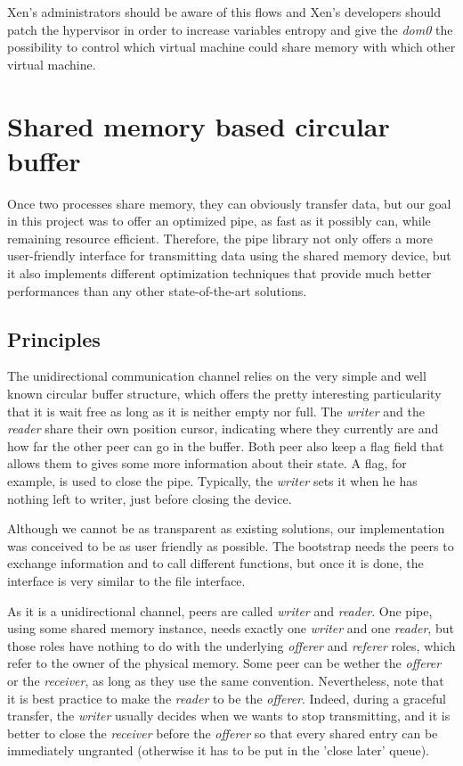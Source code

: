 \documentclass[journal]{IEEEtran}
\begin{document}
Xen's administrators should be aware of this flows and Xen's developers should patch the hypervisor in order to increase variables entropy and give the \emph{dom0} the possibility to control which virtual machine could share memory with which other virtual machine.

\section{Shared memory based circular buffer}

Once two processes share memory, they can obviously transfer data, but our goal in this project was to offer an optimized pipe, as fast as it possibly can, while remaining resource efficient. Therefore, the pipe library not only offers a more user-friendly interface for transmitting data using the shared memory device, but it also implements different optimization techniques that provide much better performances than any other state-of-the-art solutions. 

\subsection{Principles}

The unidirectional communication channel relies on the very simple and well known circular buffer structure, which offers the pretty interesting particularity that it is wait free as long as it is neither empty nor full. The \emph{writer} and the \emph{reader} share their own position cursor, indicating where they currently are and how far the other peer can go in the buffer. Both peer also keep a flag field that allows them to gives some more information about their state. A flag, for example, is used to close the pipe. Typically, the \emph{writer} sets it when he has nothing left to writer, just before closing the device. 

Although we cannot be as transparent as existing solutions, our implementation was conceived to be as user friendly as possible. The bootstrap needs the peers to exchange information and to call different functions, but once it is done, the interface is very similar to the file interface. 

As it is a unidirectional channel, peers are called \emph{writer} and \emph{reader}. One pipe, using some shared memory instance, needs exactly one \emph{writer} and one \emph{reader}, but those roles have nothing to do with the underlying \emph{offerer} and \emph{referer} roles, which refer to the owner of the physical memory. Some peer can be wether the \emph{offerer} or the \emph{receiver}, as long as they use the same convention. Nevertheless, note that it is best practice to make the \emph{reader} to be the \emph{offerer}. Indeed, during a graceful transfer, the \emph{writer} usually decides when we wants to stop transmitting, and it is better to close the \emph{receiver} before the \emph{offerer} so that every shared entry can be immediately ungranted (otherwise it has to be put in the 'close later' queue).
\end{document}
